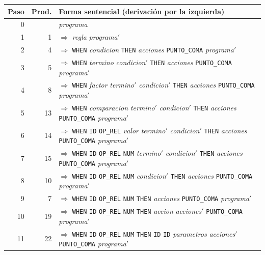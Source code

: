 \begin{longtable}{@{}r r >{\raggedright\arraybackslash}p{12.2cm}@{}}
\toprule
\textbf{Paso} & \textbf{Prod.} & \textbf{Forma sentencial (derivación por la izquierda)} \\
\midrule
\endhead
0 &  & \footnotesize \textit{programa} \\
1 & 1 & $\Rightarrow$ \footnotesize \textit{regla} \textit{programa}$'$ \\
2 & 4 & $\Rightarrow$ \footnotesize \texttt{WHEN} \textit{condicion} \texttt{THEN} \textit{acciones} \texttt{PUNTO\_COMA} \textit{programa}$'$ \\
3 & 5 & $\Rightarrow$ \footnotesize \texttt{WHEN} \textit{termino} \textit{condicion}$'$ \texttt{THEN} \textit{acciones} \texttt{PUNTO\_COMA} \textit{programa}$'$ \\
4 & 8 & $\Rightarrow$ \footnotesize \texttt{WHEN} \textit{factor} \textit{termino}$'$ \textit{condicion}$'$ \texttt{THEN} \textit{acciones} \texttt{PUNTO\_COMA} \textit{programa}$'$ \\
5 & 13 & $\Rightarrow$ \footnotesize \texttt{WHEN} \textit{comparacion} \textit{termino}$'$ \textit{condicion}$'$ \texttt{THEN} \textit{acciones} \texttt{PUNTO\_COMA} \textit{programa}$'$ \\
6 & 14 & $\Rightarrow$ \footnotesize \texttt{WHEN} \texttt{ID} \texttt{OP\_REL} \textit{valor} \textit{termino}$'$ \textit{condicion}$'$ \texttt{THEN} \textit{acciones} \texttt{PUNTO\_COMA} \textit{programa}$'$ \\
7 & 15 & $\Rightarrow$ \footnotesize \texttt{WHEN} \texttt{ID} \texttt{OP\_REL} \texttt{NUM} \textit{termino}$'$ \textit{condicion}$'$ \texttt{THEN} \textit{acciones} \texttt{PUNTO\_COMA} \textit{programa}$'$ \\
8 & 10 & $\Rightarrow$ \footnotesize \texttt{WHEN} \texttt{ID} \texttt{OP\_REL} \texttt{NUM} \textit{condicion}$'$ \texttt{THEN} \textit{acciones} \texttt{PUNTO\_COMA} \textit{programa}$'$ \\
9 & 7 & $\Rightarrow$ \footnotesize \texttt{WHEN} \texttt{ID} \texttt{OP\_REL} \texttt{NUM} \texttt{THEN} \textit{acciones} \texttt{PUNTO\_COMA} \textit{programa}$'$ \\
10 & 19 & $\Rightarrow$ \footnotesize \texttt{WHEN} \texttt{ID} \texttt{OP\_REL} \texttt{NUM} \texttt{THEN} \textit{accion} \textit{acciones}$'$ \texttt{PUNTO\_COMA} \textit{programa}$'$ \\
11 & 22 & $\Rightarrow$ \footnotesize \texttt{WHEN} \texttt{ID} \texttt{OP\_REL} \texttt{NUM} \texttt{THEN} \texttt{ID} \texttt{ID} \textit{parametros} \textit{acciones}$'$ \texttt{PUNTO\_COMA} \textit{programa}$'$ \\

\end{longtable}
